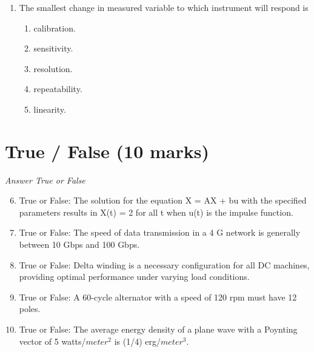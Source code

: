 \documentclass[12pt]{article}
\begin{document}
\begin{enumerate}[label=\arabic*.]
\begin{enumerate}[label=(\alph*)]
    \item Input: 4235 watts, Output: 3600 watts, Efficiency: 85 percent
    \item Input: 4500 watts, Output: 4000 watts, Efficiency: 88.9 percent
    \item Input: 4350 watts, Output: 3730 watts, Efficiency: 85.7 percent
    \item Input: 4100 watts, Output: 3450 watts, Efficiency: 84.1 percent
    \item Input: 4200 watts, Output: 3900 watts, Efficiency: 86 percent
\end{enumerate}
\item The smallest change in measured variable to which instrument will respond is
\begin{enumerate}[label=(\alph*)]
    \item calibration.
    \item sensitivity.
    \item resolution.
    \item repeatability.
    \item linearity.
\end{enumerate}
\end{enumerate}

\section*{True / False (10 marks)}
\textit{Answer True or False}
\begin{enumerate}[label=\arabic*.]
\setcounter{enumi}{5}
\item True or False: The solution for the equation X = AX + bu with the specified parameters results in X(t) = 2 for all t when u(t) is the impulse function.
\item True or False: The speed of data transmission in a 4 G network is generally between 10 Gbps and 100 Gbps.
\item True or False: Delta winding is a necessary configuration for all DC machines, providing optimal performance under varying load conditions.
\item True or False: A 60-cycle alternator with a speed of 120 rpm must have 12 poles.
\item True or False: The average energy density of a plane wave with a Poynting vector of 5 watts/$meter^2$ is (1/4) erg/$meter^3$.
\end{enumerate}
\end{document}
